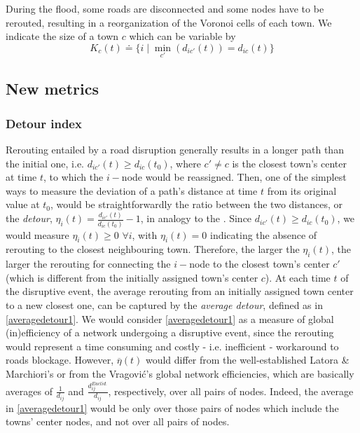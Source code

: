 \documentclass[twocolumn,fleqn,10pt]{wlscirep}
\begin{document}
%
During the flood, some roads are disconnected and some nodes have to be rerouted, resulting in a reorganization of the Voronoi cells of each town.
We indicate the size of a town $c$ which can be variable by
\begin{equation}
K_c(t) \doteq \{ i \mid \min\limits_{c'} (d_{i c'} (t)) = d_{ic} (t) \}
    \label{widetildeK_c}
\end{equation}








\subsection{New metrics}
\label{newmetrics_methods} 





\subsubsection*{Detour index}




Rerouting entailed by a road disruption generally results in a longer path than the initial one, 
i.e. $d_{ic'}(t) \geq d_{ic}(t_0)$, 
where $c' \neq c$ is the closest town's center at time $t$, to which the $i-$node would be reassigned. Then, one of the simplest ways to measure the deviation of a path's distance at time $t$ from its original value at $t_0$, would be straightforwardly the ratio between the two distances, or the \emph{detour}, $\eta_i(t) = \frac{d_{ic'}(t)}{d_{ic}(t_0)}-1$, in analogy to the  \cite{Barthelemy,Aldous}. Since $d_{ic'}(t) \geq d_{ic}(t_0)$, we would measure $\eta_i(t) \geq 0$ $\forall i$, with $\eta_i(t) = 0$ indicating the absence of rerouting to the closest neighbouring town. Therefore, the larger the $\eta_i(t)$, the larger the rerouting for connecting the $i-$node to the closest town's center $c'$ (which is different from the initially assigned town's center $c$). At each time $t$ of the disruptive event, the average rerouting from an initially assigned town center to a new closest one, can be captured by the \emph{average detour}, defined as in \cref{averagedetour1}.
We would consider \cref{averagedetour1} as a measure of global (in)efficiency of a network undergoing a disruptive event, since the rerouting would represent a time consuming and costly - i.e. inefficient - workaround to roads blockage. However, $\overline{\eta}(t)$ would differ from the well-established Latora \& Marchiori's \cite{Latora} or from the Vragović's \cite{Vragovic} global network efficiencies, which are basically averages of $\frac{1}{d_{ij}}$ and $\frac{d_{ij}^{Euclid.}}{d_{ij}}$, respectively, over all pairs of nodes. Indeed, the average in \cref{averagedetour1} would be only over those pairs of nodes which include the towns' center nodes, and not over all pairs of nodes.
\end{document}

